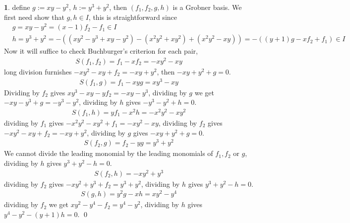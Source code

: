 \documentclass[11pt]{article}
\theoremstyle{definition}
\newtheorem{pb}{}
\newcommand{\tor}{\text{ or }}
\begin{document}
    \begin{pb}
        define \(g := xy-y^2\), \(h := y^3 + y^2\), then \((f_1,f_2,g,h)\) is a Grobner basis.  We first need show that \(g,h \in I\), this is straightforward since
        \begin{align*}
            &g = xy-y^2 = (x-1)f_2 - f_1  \in I\\
            &h = y^3 + y^2 = -((xy^2 - y^3 + xy - y^2) - (x^2y^2 + xy^2) + (x^2y^2 - xy)) =  -((y+1)g - xf_2 + f_1) \in I
        \end{align*}
        Now it will suffice to check Buchburger's criterion for each pair,
        \begin{align*}
            S(f_1,f_2) = f_1 - xf_2 = -xy^2 - xy 
        \end{align*}
        long division furnishes  \(-xy^2 - xy + f_2 = -xy+y^2\), then \(-xy+y^2 + g = 0\).
        \begin{align*}
            S(f_1,g) = f_1 - xyg = xy^3 - xy
        \end{align*}
        Dividing by \(f_2\) gives \(xy^3 - xy - yf_2 = -xy - y^3\), dividing by \(g\) we get \(-xy - y^3 + g = -y^3 - y^2\), dividing by \(h\) gives \(-y^3 - y^2 + h = 0\).
        \begin{align*}
            S(f_1,h) = yf_1 - x^2h = -x^2y^2 - xy^2
        \end{align*}
        dividing by \(f_1\) gives \(-x^2y^2 - xy^2 + f_1 = -xy^2 - xy\), dividing by \(f_2\) gives \(-xy^2 - xy + f_2 = -xy + y^2\), dividing by \(g\) gives \(-xy + y^2 + g = 0\).
        \begin{align*}
            S(f_2,g) = f_2 - yg = y^3 + y^2
        \end{align*}
        We cannot divide the leading monomial by the leading monomials of \(f_1,f_2 \tor g\), dividing by \(h\) gives \(y^3 + y^2 - h = 0\).
        \begin{align*}
            S(f_2,h) = -xy^2 + y^3
        \end{align*}
        dividing by \(f_2\) gives \(-xy^2 + y^3 + f_2 = y^3 + y^2\), dividing by \(h\) gives \(y^3 + y^2 - h = 0\).
        \begin{align*}
            S(g,h) = y^2g - xh = xy^2 - y^4
        \end{align*}
        dividing by \(f_2\) we get \(xy^2 - y^4 - f_2 = y^4 - y^2\), dividing by \(h\) gives \(y^4 - y^2 - (y + 1)h = 0\). \qed
    \end{pb}
\end{document}

